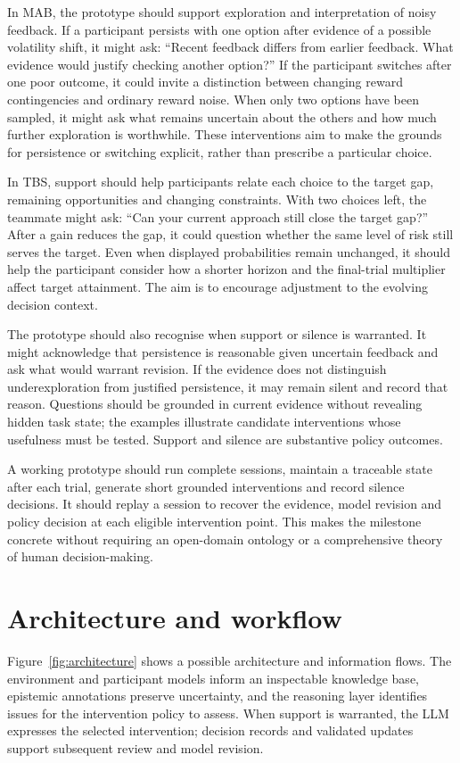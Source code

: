 \documentclass[11pt,a4paper]{article}
\begin{document}
In MAB, the prototype should support exploration and interpretation of noisy feedback. If a participant persists with one option after evidence of a possible volatility shift, it might ask: ``Recent feedback differs from earlier feedback. What evidence would justify checking another option?'' If the participant switches after one poor outcome, it could invite a distinction between changing reward contingencies and ordinary reward noise. When only two options have been sampled, it might ask what remains uncertain about the others and how much further exploration is worthwhile. These interventions aim to make the grounds for persistence or switching explicit, rather than prescribe a particular choice.

In TBS, support should help participants relate each choice to the target gap, remaining opportunities and changing constraints. With two choices left, the teammate might ask: ``Can your current approach still close the target gap?'' After a gain reduces the gap, it could question whether the same level of risk still serves the target. Even when displayed probabilities remain unchanged, it should help the participant consider how a shorter horizon and the final-trial multiplier affect target attainment. The aim is to encourage adjustment to the evolving decision context.

The prototype should also recognise when support or silence is warranted. It might acknowledge that persistence is reasonable given uncertain feedback and ask what would warrant revision. If the evidence does not distinguish underexploration from justified persistence, it may remain silent and record that reason. Questions should be grounded in current evidence without revealing hidden task state; the examples illustrate candidate interventions whose usefulness must be tested. Support and silence are substantive policy outcomes.

A working prototype should run complete sessions, maintain a traceable state after each trial, generate short grounded interventions and record silence decisions. It should replay a session to recover the evidence, model revision and policy decision at each eligible intervention point. This makes the milestone concrete without requiring an open-domain ontology or a comprehensive theory of human decision-making.

\section{Architecture and workflow}
Figure~\ref{fig:architecture} shows a possible architecture and information flows. The environment and participant models inform an inspectable knowledge base, epistemic annotations preserve uncertainty, and the reasoning layer identifies issues for the intervention policy to assess. When support is warranted, the LLM expresses the selected intervention; decision records and validated updates support subsequent review and model revision. 
\end{document}
